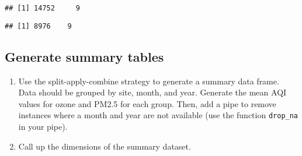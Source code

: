 \documentclass[]{article}
\newenvironment{Shaded}{\begin{snugshade}}{\end{snugshade}}
\newcommand{\CommentTok}[1]{\textcolor[rgb]{0.56,0.35,0.01}{\textit{#1}}}
\newcommand{\DataTypeTok}[1]{\textcolor[rgb]{0.13,0.29,0.53}{#1}}
\newcommand{\KeywordTok}[1]{\textcolor[rgb]{0.13,0.29,0.53}{\textbf{#1}}}
\newcommand{\NormalTok}[1]{#1}
\newcommand{\OtherTok}[1]{\textcolor[rgb]{0.56,0.35,0.01}{#1}}
\newcommand{\StringTok}[1]{\textcolor[rgb]{0.31,0.60,0.02}{#1}}
\begin{document}
\begin{verbatim}
## [1] 14752     9
\end{verbatim}

\begin{Shaded}
\end{Shaded}

\begin{verbatim}
## [1] 8976    9
\end{verbatim}

\begin{Shaded}
\end{Shaded}

\hypertarget{generate-summary-tables}{%
\subsection{Generate summary tables}\label{generate-summary-tables}}

\begin{enumerate}
\def\labelenumi{\arabic{enumi}.}
\setcounter{enumi}{11}
\item
  Use the split-apply-combine strategy to generate a summary data frame.
  Data should be grouped by site, month, and year. Generate the mean AQI
  values for ozone and PM2.5 for each group. Then, add a pipe to remove
  instances where a month and year are not available (use the function
  \texttt{drop\_na} in your pipe).
\item
  Call up the dimensions of the summary dataset.
\end{enumerate}
\end{document}
